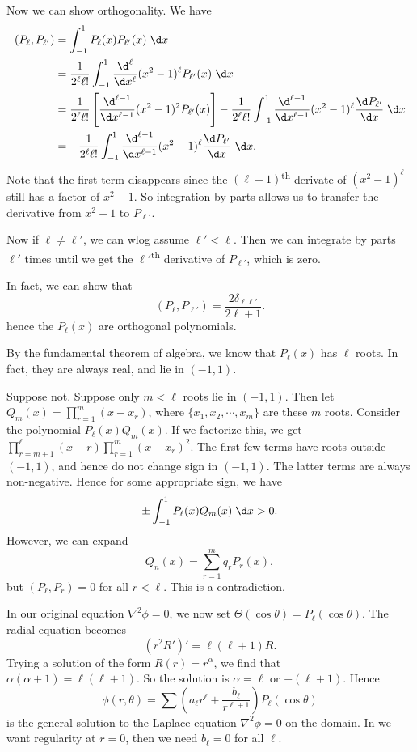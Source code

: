 \documentclass[a4paper]{article}
\begin{document}
Now we can show orthogonality. We have
\begin{align*}
  (P_\ell, P_{\ell'}) &= \int_{-1}^1 P_\ell(x) P_{\ell'}(x) \;\d x\\
  &= \frac{1}{2^\ell \ell!}\int_{-1}^1 \frac{\d^\ell}{\d x^\ell} (x^2 - 1)^\ell P_{\ell'}(x)\;\d x\\
  &= \frac{1}{2^\ell \ell!}\left[\frac{\d^{\ell - 1}}{\d x^{\ell - 1}} (x^2 - 1)^2 P_{\ell'}(x)\right]  - \frac{1}{2^\ell \ell!} \int_{-1}^1 \frac{\d^{\ell - 1}}{\d x^{\ell - 1}}(x^2 - 1)^\ell \frac{\d P_{\ell'}}{\d x}\;\d x\\
  &= - \frac{1}{2^\ell \ell!} \int_{-1}^1 \frac{\d^{\ell - 1}}{\d x^{\ell - 1}}(x^2 - 1)^\ell \frac{\d P_{\ell'}}{\d x}\;\d x.
\end{align*}
Note that the first term disappears since the $(\ell - 1)$\textsuperscript{th} derivate of $(x^2 - 1)^\ell$ still has a factor of $x^2 - 1$. So integration by parts allows us to transfer the derivative from $x^2 - 1$ to $P_{\ell'}$.

Now if $\ell \not= \ell'$, we can wlog assume $\ell' < \ell$. Then we can integrate by parts $\ell'$ times until we get the $\ell'$\textsuperscript{th} derivative of $P_{\ell'}$, which is zero.

In fact, we can show that
\[
  (P_\ell, P_{\ell'}) = \frac{2\delta_{\ell\ell'}}{2\ell + 1}.
\]
hence the $P_\ell(x)$ are orthogonal polynomials.

By the fundamental theorem of algebra, we know that $P_\ell(x)$ has $\ell$ roots. In fact, they are always real, and lie in $(-1, 1)$.

Suppose not. Suppose only $m < \ell$ roots lie in $(-1, 1)$. Then let $Q_m(x) = \prod_{r = 1}^m (x - x_r)$, where $\{x_1, x_2, \cdots, x_m\}$ are these $m$ roots. Consider the polynomial $P_{\ell}(x)Q_m(x)$. If we factorize this, we get $\prod_{r = m + 1}^\ell (x - r)\prod_{r = 1}^m (x - x_r)^2$. The first few terms have roots outside $(-1, 1)$, and hence do not change sign in $(-1, 1)$. The latter terms are always non-negative. Hence for some appropriate sign, we have
\[
  \pm\int_{-1}^1 P_\ell(x) Q_m(x) \;\d x > 0.
\]
However, we can expand
\[
  Q_n(x) = \sum_{r = 1}^m q_r P_r(x),
\]
but $(P_\ell, P_r) = 0$ for all $r < \ell$. This is a contradiction.

In our original equation $\nabla^2 \phi = 0$, we now set $\Theta(\cos \theta) = P_\ell(\cos \theta)$. The radial equation becomes
\[
  (r^2 R')' = \ell(\ell + 1)R.
\]
Trying a solution of the form $R(r) = r^\alpha$, we find that $\alpha(\alpha + 1) = \ell(\ell + 1)$. So the solution is $\alpha = \ell$ or $-(\ell + 1)$. Hence
\[
  \phi(r, \theta) = \sum \left(a_\ell r^\ell + \frac{b_\ell}{r^{\ell + 1}}\right) P_\ell(\cos \theta)
\]
is the general solution to the Laplace equation $\nabla^2 \phi = 0$ on the domain. In we want regularity at $r = 0$, then we need $b_\ell = 0$ for all $\ell$.
\end{document}
